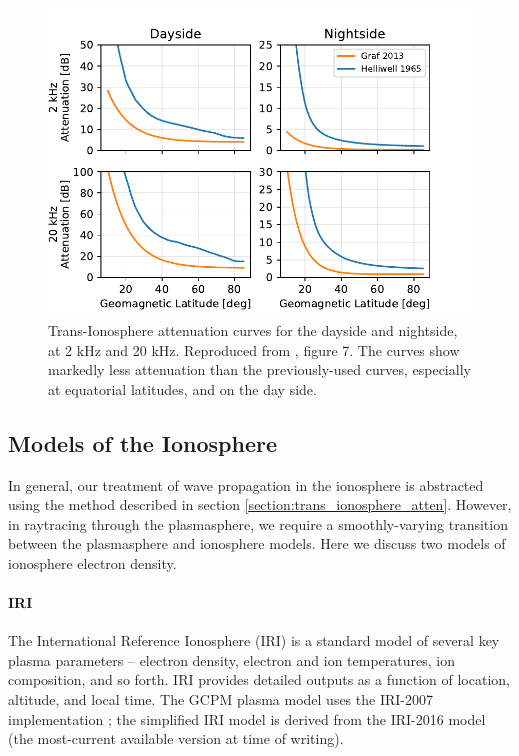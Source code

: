 \begin{figure}[h]
\begin{center}
\includegraphics{figures/iono_absorp_curves}
\caption[Trans-Ionosphere attenuation curves for day and night]{Trans-Ionosphere attenuation curves for the dayside and nightside, at 2 kHz and 20 kHz. Reproduced from \cite{Graf2013}, figure 7. The \citeauthor{Graf2013} curves show markedly less attenuation than the previously-used \citeauthor{Helliwell1965} curves, especially at equatorial latitudes, and on the day side.}
\label{fig:graf_curves}
\end{center}
\end{figure}


\subsection{Models of the Ionosphere}
In general, our treatment of wave propagation in the ionosphere is abstracted using the method described in section \ref{section:trans_ionosphere_atten}. However, in raytracing through the plasmasphere, we require a smoothly-varying transition between the plasmasphere and ionosphere models. Here we discuss two models of ionosphere electron density.

\paragraph{IRI}
The International Reference Ionosphere (IRI) is a standard model of several key plasma parameters -- electron density, electron and ion temperatures, ion composition, and so forth. IRI provides detailed outputs as a function of location, altitude, and local time. The GCPM plasma model uses the IRI-2007 implementation \citep{Bilitza2008}; the simplified IRI model is derived from the IRI-2016 model (the most-current available version at time of writing).

